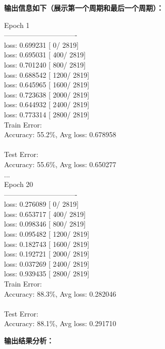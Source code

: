 \textbf{输出信息如下（展示第一个周期和最后一个周期）：}
\vspace{-2mm} %
\begin{tcolorbox}[colframe=blue!50!black, colback=blue!10!white, coltitle=black, sharp corners, top=0mm, bottom=0mm, boxrule=0.8mm, breakable]
Epoch 1\\
------------------------------- \\
loss: 0.699231  [    0/ 2819]\\
loss: 0.695031  [  400/ 2819]\\
loss: 0.701240  [  800/ 2819]\\
loss: 0.688542  [ 1200/ 2819]\\
loss: 0.645965  [ 1600/ 2819]\\
loss: 0.723638  [ 2000/ 2819]\\
loss: 0.644932  [ 2400/ 2819]\\
loss: 0.773314  [ 2800/ 2819]\\
Train Error: \\
 Accuracy: 55.2\%, Avg loss: 0.678958 \\
\\
Test Error: \\
 Accuracy: 55.6\%, Avg loss: 0.650277 \\
...\\
Epoch 20\\
------------------------------- \\
loss: 0.276089  [    0/ 2819]\\
loss: 0.653717  [  400/ 2819]\\
loss: 0.098346  [  800/ 2819]\\
loss: 0.095482  [ 1200/ 2819]\\
loss: 0.182743  [ 1600/ 2819]\\
loss: 0.192721  [ 2000/ 2819]\\
loss: 0.037269  [ 2400/ 2819]\\
loss: 0.939435  [ 2800/ 2819]\\
Train Error: \\
 Accuracy: 88.3\%, Avg loss: 0.282046 \\
\\
Test Error: \\
 Accuracy: 88.1\%, Avg loss: 0.291710\\
\end{tcolorbox}
\vspace{-2mm} %
\textbf{输出结果分析：}
